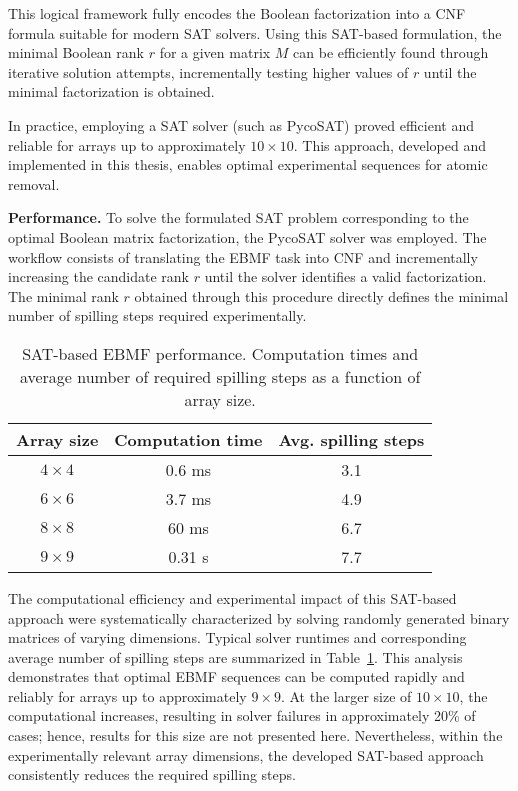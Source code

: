 This logical framework fully encodes the Boolean factorization into a CNF formula suitable for modern SAT solvers. Using this SAT-based formulation, the minimal Boolean rank $r$ for a given matrix $M$ can be efficiently found through iterative solution attempts, incrementally testing higher values of $r$ until the minimal factorization is obtained.

In practice, employing a SAT solver (such as PycoSAT) proved efficient and reliable for arrays up to approximately $10\times 10$. This approach, developed and implemented in this thesis, enables optimal experimental sequences for atomic removal.


\textbf{Performance.} To solve the formulated SAT problem corresponding to the optimal Boolean matrix factorization, the PycoSAT solver was employed. The workflow consists of translating the EBMF task into CNF and incrementally increasing the candidate rank $r$ until the solver identifies a valid factorization. The minimal rank $r$ obtained through this procedure directly defines the minimal number of spilling steps required experimentally.


\begin{table}
\centering
\caption{SAT-based EBMF performance. Computation times and average number of required spilling steps as a function of array size.}
\begin{tabular}{ccc}
\toprule
Array size & Computation time & Avg. spilling steps \\
\midrule
$4\times 4$ & 0.6 ms & 3.1 \\
$6\times 6$ & 3.7 ms & 4.9 \\
$8\times 8$ & 60 ms & 6.7 \\
$9\times 9$ & 0.31 s & 7.7 \\
\bottomrule
\end{tabular}
\label{tab:sat-performance}
\end{table}


The computational efficiency and experimental impact of this SAT-based approach were systematically characterized by solving randomly generated binary matrices of varying dimensions. Typical solver runtimes and corresponding average number of spilling steps are summarized in Table~\ref{tab:sat-performance}. This analysis demonstrates that optimal EBMF sequences can be computed rapidly and reliably for arrays up to approximately $9 \times 9$. At the larger size of $10 \times 10$, the computational increases, resulting in solver failures in approximately 20\% of cases; hence, results for this size are not presented here. Nevertheless, within the experimentally relevant array dimensions, the developed SAT-based approach consistently reduces the required spilling steps.